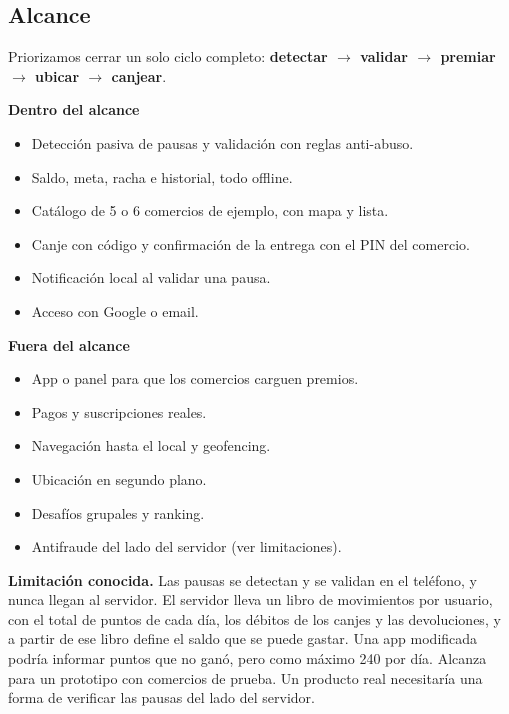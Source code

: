 \subsection{Alcance}

Priorizamos cerrar un solo ciclo completo: \textbf{detectar $\rightarrow$ validar $\rightarrow$ premiar $\rightarrow$ ubicar $\rightarrow$ canjear}.

\begin{minipage}[t]{0.49\textwidth}
\textbf{Dentro del alcance}
\begin{itemize}
\item Detección pasiva de pausas y validación con reglas anti-abuso.
\item Saldo, meta, racha e historial, todo offline.
\item Catálogo de 5 o 6 comercios de ejemplo, con mapa y lista.
\item Canje con código y confirmación de la entrega con el PIN del comercio.
\item Notificación local al validar una pausa.
\item Acceso con Google o email.
\end{itemize}
\end{minipage}\hfill
\begin{minipage}[t]{0.49\textwidth}
\textbf{Fuera del alcance}
\begin{itemize}
\item App o panel para que los comercios carguen premios.
\item Pagos y suscripciones reales.
\item Navegación hasta el local y geofencing.
\item Ubicación en segundo plano.
\item Desafíos grupales y ranking.
\item Antifraude del lado del servidor (ver limitaciones).
\end{itemize}
\end{minipage}

\medskip
\textbf{Limitación conocida.} Las pausas se detectan y se validan en el teléfono, y nunca llegan al servidor. El servidor lleva un libro de movimientos por usuario, con el total de puntos de cada día, los débitos de los canjes y las devoluciones, y a partir de ese libro define el saldo que se puede gastar. Una app modificada podría informar puntos que no ganó, pero como máximo 240 por día. Alcanza para un prototipo con comercios de prueba. Un producto real necesitaría una forma de verificar las pausas del lado del servidor.
